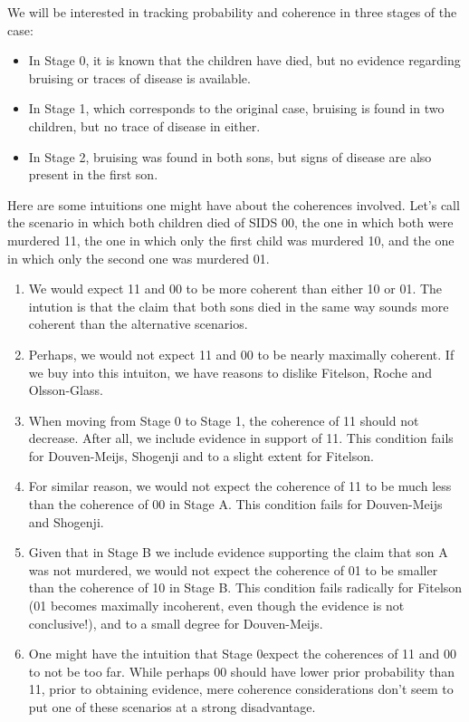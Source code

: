 \documentclass[10pt,]{scrartcl}
\begin{document}
We will be interested in tracking probability and coherence in three stages of the case: 
\begin{itemize} 
\item In \textsf{Stage 0}, it is known that the children have died, but no evidence regarding bruising or traces of disease is available.

\item In \textsf{Stage 1}, which corresponds to the original case, bruising is found in two children, but no trace of disease in either.

\item In \textsf{Stage 2}, bruising was found in both sons, but signs of disease are also present in the first son. 
\end{itemize}



Here  are some intuitions one might have about the coherences involved. Let's call the scenario in which both children died of SIDS 00, the one in which both were murdered 11, the one in which only the first child was murdered 10, and the one in which only the second one was murdered 01.

\begin{enumerate}
    \item We would expect 11 and 00 to be more coherent than either 10 or 01. The intution is that the claim that both sons died in the same way sounds more coherent than the alternative scenarios.  %
    \item Perhaps, we would not expect 11 and 00 to be nearly maximally coherent. If we buy into this intuiton, we have reasons to dislike Fitelson, Roche and Olsson-Glass.
    \item When moving from Stage 0 to Stage 1, the coherence of 11 should not decrease. After all, we include evidence in support of 11. This condition fails for Douven-Meijs, Shogenji and to a slight extent for Fitelson.
    \item For similar reason, we would not expect the coherence of 11 to be much less than the coherence of 00 in Stage A. This condition fails for Douven-Meijs and Shogenji.
    \item Given that in Stage B we include evidence supporting the claim that son A was not murdered, we would not expect the coherence of 01 to be smaller than the coherence of 10 in Stage B. This condition fails radically for Fitelson (01 becomes maximally incoherent, even though the evidence is not conclusive!), and to a small degree for Douven-Meijs.

    \item  One might have the intuition that \textsf{Stage 0}expect the coherences of 11 and 00 to not be too far. While perhaps 00 should have lower prior probability than 11,  prior to obtaining evidence, mere coherence considerations don't seem to put one of these scenarios at a strong disadvantage.
\end{enumerate}
\end{document}
